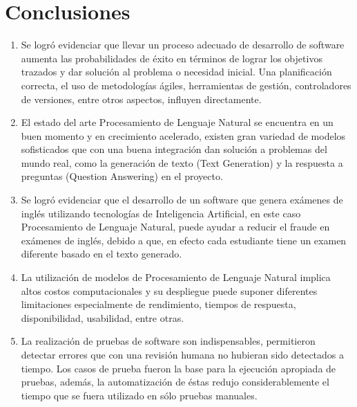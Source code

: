 \documentclass[../Main.tex]{subfiles}
\begin{document}
\section{Conclusiones}

    \begin{justify}
    
    \begin{enumerate}
        \item Se logró evidenciar que llevar un proceso adecuado de desarrollo de software aumenta las probabilidades de éxito en términos de lograr los objetivos trazados y dar solución al problema o necesidad inicial. Una planificación correcta, el uso de metodologías ágiles, herramientas de gestión, controladores de versiones, entre otros aspectos, influyen directamente.

        \item El estado del arte Procesamiento de Lenguaje Natural se encuentra en un buen momento y en crecimiento acelerado, existen gran variedad de modelos sofisticados que con una buena integración dan solución a problemas del mundo real, como la generación de texto (Text Generation) y la respuesta a preguntas (Question Answering) en el proyecto.
            
        \item Se logró evidenciar que el desarrollo de un software que genera exámenes de inglés utilizando tecnologías de Inteligencia Artificial, en este caso Procesamiento de Lenguaje Natural, puede ayudar a reducir el fraude en exámenes de inglés, debido a que, en efecto cada estudiante tiene un examen diferente basado en el texto generado.
        
        \item La utilización de modelos de Procesamiento de Lenguaje Natural implica altos costos computacionales y su despliegue puede suponer diferentes limitaciones especialmente de rendimiento, tiempos de respuesta, disponibilidad, usabilidad, entre otras.
        
        \item La realización de pruebas de software son indispensables, permitieron detectar errores que con una revisión humana no hubieran sido detectados a tiempo. Los casos de prueba fueron la base para la ejecución apropiada de pruebas, además, la automatización de éstas redujo considerablemente el tiempo que se fuera utilizado en sólo pruebas manuales. 
        
    \end{enumerate}
    
    \end{justify}
\end{document}
